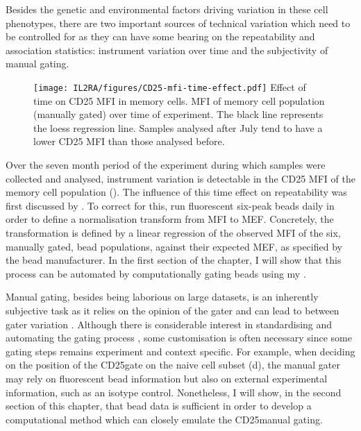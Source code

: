 Besides the genetic and environmental factors driving variation in these cell phenotypes, there are two important sources of technical variation which 
need to be controlled for as they can have some bearing on the repeatability and association statistics:
instrument variation over time and the subjectivity of manual gating.

\begin{figure}[h]
\centering
\texttt{[image: IL2RA/figures/CD25-mfi-time-effect.pdf]}
{Effect of time on CD25 MFI in memory cells.}
{
 MFI of memory cell population (manually gated) over time of experiment.
The black line represents the loess regression line.
Samples analysed after July tend to have a lower CD25 MFI than those analysed before.
}
\end{figure} 

Over the seven month period of the experiment during which samples were collected and analysed,
instrument variation is detectable in the CD25 \gls{MFI} of the memory cell population ().
The influence of this time effect on repeatability was first discussed by \citet{Dendrou:2009bl}.  
To correct for this, \citet{Dendrou:2009dv} run fluorescent six-peak beads daily in order to define a normalisation transform from \gls{MFI} to \gls{MEF}.
Concretely, the transformation is defined by a linear regression
of the observed \gls{MFI} of the six, manually gated, bead populations, against their
expected \gls{MEF}, as specified by the bead manufacturer.
In the first section of the chapter, I will show that this process can be automated by computationally gating beads using my .

Manual gating, besides being laborious on large datasets, is an inherently subjective task as it relies on the opinion of the gater and can lead to
between gater variation \citep{Maecker:2005gm}.
Although there is considerable interest in standardising and automating the gating process \citep{Aghaeepour:2013dg},
some customisation is often necessary since some gating steps remains experiment and context specific.  
For example, when deciding on the position of the CD25\positive gate on the naive cell subset (d), the manual gater 
may rely on fluorescent bead information but also on external experimental information, such as an isotype control.
Nonetheless, I will show, in the second section of this chapter,
that bead data is sufficient in order to develop a computational method which can closely emulate the CD25\positive manual gating.

